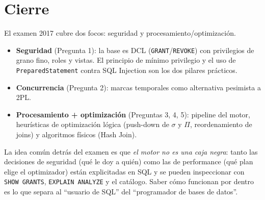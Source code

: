 \documentclass[11pt,a4paper]{article}
\begin{document}
\section*{Cierre}

El examen 2017 cubre dos focos: seguridad y procesamiento/optimización.

\begin{itemize}
    \item \textbf{Seguridad} (Pregunta 1): la base es DCL (\texttt{GRANT}/\texttt{REVOKE}) con privilegios de grano fino, roles y vistas. El principio de mínimo privilegio y el uso de \texttt{PreparedStatement} contra SQL Injection son los dos pilares prácticos.
    \item \textbf{Concurrencia} (Pregunta 2): marcas temporales como alternativa pesimista a 2PL.
    \item \textbf{Procesamiento + optimización} (Preguntas 3, 4, 5): pipeline del motor, heurísticas de optimización lógica (push-down de $\sigma$ y $\Pi$, reordenamiento de joins) y algoritmos físicos (Hash Join).
\end{itemize}

La idea común detrás del examen es que \emph{el motor no es una caja negra}: tanto las decisiones de seguridad (qué le doy a quién) como las de performance (qué plan elige el optimizador) están explicitadas en SQL y se pueden inspeccionar con \texttt{SHOW GRANTS}, \texttt{EXPLAIN ANALYZE} y el catálogo. Saber cómo funcionan por dentro es lo que separa al ``usuario de SQL'' del ``programador de bases de datos''.
\end{document}
